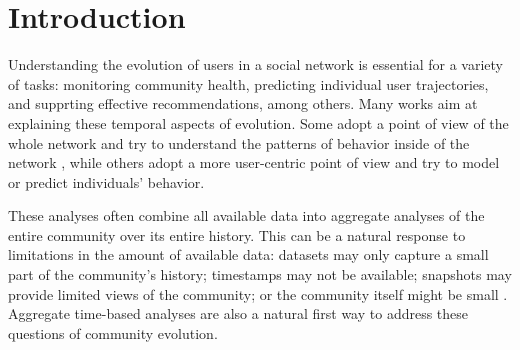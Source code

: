 
\section{Introduction}

Understanding the evolution of users in a social network is essential for a variety of tasks: monitoring community health, predicting individual user trajectories, and supprting effective recommendations, among others.  Many works aim at explaining these temporal aspects of evolution. Some adopt a point of view of the whole network and try to understand the patterns of behavior inside of the network \cite{Zhu2014, Kooti2010}, while others adopt a more user-centric point of view and try to model \cite{Correa2010, Priedhorsky2007, Panciera2009, Welser2011Roles} or predict \cite{Danescu-niculescu-mizil2013} individuals' behavior.


These analyses often combine all available data into aggregate analyses of the entire community over its entire history.  This can be a natural response to limitations in the amount of available data: datasets may only capture a small part of the community's history; timestamps may not be available; snapshots may provide limited views of the community; or the community itself might be small \cite{Lewis2008}.  Aggregate time-based analyses are also a natural first way to address these questions of community evolution.

